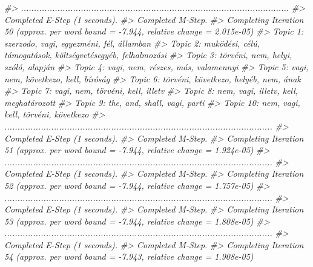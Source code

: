 \documentclass[
]{book}
\newenvironment{Shaded}{\begin{snugshade}}{\end{snugshade}}
\newcommand{\CommentTok}[1]{\textcolor[rgb]{0.56,0.35,0.01}{\textit{#1}}}
\begin{document}
\begin{Shaded}
\begin{Highlighting}[]
\CommentTok{\#\textgreater{} .......................................................................................................}
\CommentTok{\#\textgreater{} Completed E{-}Step (1 seconds). }
\CommentTok{\#\textgreater{} Completed M{-}Step. }
\CommentTok{\#\textgreater{} Completing Iteration 50 (approx. per word bound = {-}7.944, relative change = 2.015e{-}05) }
\CommentTok{\#\textgreater{} Topic 1: szerzodo, vagi, egyezméni, fél, államban }
\CommentTok{\#\textgreater{}  Topic 2: muködési, célú, támogatások, költségvetésegyéb, felhalmozási }
\CommentTok{\#\textgreater{}  Topic 3: törvéni, nem, helyi, szóló, alapján }
\CommentTok{\#\textgreater{}  Topic 4: vagi, nem, részes, más, valamennyi }
\CommentTok{\#\textgreater{}  Topic 5: vagi, nem, következo, kell, bíróság }
\CommentTok{\#\textgreater{}  Topic 6: törvéni, következo, helyéb, nem, ának }
\CommentTok{\#\textgreater{}  Topic 7: vagi, nem, törvéni, kell, illetv }
\CommentTok{\#\textgreater{}  Topic 8: nem, vagi, illetv, kell, meghatározott }
\CommentTok{\#\textgreater{}  Topic 9: the, and, shall, vagi, parti }
\CommentTok{\#\textgreater{}  Topic 10: nem, vagi, kell, törvéni, következo }
\CommentTok{\#\textgreater{} .......................................................................................................}
\CommentTok{\#\textgreater{} Completed E{-}Step (1 seconds). }
\CommentTok{\#\textgreater{} Completed M{-}Step. }
\CommentTok{\#\textgreater{} Completing Iteration 51 (approx. per word bound = {-}7.944, relative change = 1.924e{-}05) }
\CommentTok{\#\textgreater{} .......................................................................................................}
\CommentTok{\#\textgreater{} Completed E{-}Step (1 seconds). }
\CommentTok{\#\textgreater{} Completed M{-}Step. }
\CommentTok{\#\textgreater{} Completing Iteration 52 (approx. per word bound = {-}7.944, relative change = 1.757e{-}05) }
\CommentTok{\#\textgreater{} .......................................................................................................}
\CommentTok{\#\textgreater{} Completed E{-}Step (1 seconds). }
\CommentTok{\#\textgreater{} Completed M{-}Step. }
\CommentTok{\#\textgreater{} Completing Iteration 53 (approx. per word bound = {-}7.944, relative change = 1.808e{-}05) }
\CommentTok{\#\textgreater{} .......................................................................................................}
\CommentTok{\#\textgreater{} Completed E{-}Step (1 seconds). }
\CommentTok{\#\textgreater{} Completed M{-}Step. }
\CommentTok{\#\textgreater{} Completing Iteration 54 (approx. per word bound = {-}7.943, relative change = 1.908e{-}05) }

\end{Highlighting}
\end{Shaded}
\end{document}
